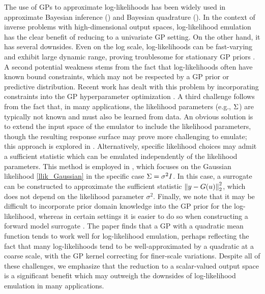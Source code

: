 \documentclass[12pt]{article}
\begin{document}
The use of GPs to approximate log-likelihoods has been widely used in approximate Bayesian inference 
(\cite{VehtariParallelGP, Kandasamy_2017, llikRBF, trainDynamics, quantileApprox, wang2018adaptive, landslideCalibration})
and Bayesian quadrature (\cite{BayesQuadrature, BayesQuadRatios}). In the context of inverse problems with 
high-dimensional output spaces, log-likelihood emulation has the clear benefit of reducing to a univariate GP setting. 
On the other hand, it has several downsides. Even on the log scale, log-likelihoods can be fast-varying and exhibit large 
dynamic range, proving troublesome for stationary GP priors \cite{wang2018adaptive}. A second potential weakness 
stems from the fact that log-likelihoods often have known bound constraints, which may not be respected by a GP 
prior or predictive distribution. Recent work has dealt with this problem by incorporating constraints into the 
GP hyperparameter optimization \cite{quantileApprox}. A third challenge follows from the fact that, in many applications, 
the likelihood parameters (e.g., $\Sigma$) are typically not known and must also be learned from data. An obvious 
solution is to extend the input space of the emulator to include the likelihood parameters, though the resulting response surface 
may prove more challenging to emulate; this approach is explored in \cite{llikRBF}. Alternatively, specific likelihood 
choices may admit a sufficient statistic which can be emulated independently of the likelihood parameters. This method is employed 
in \cite{FerEmulation}, which focuses on the Gaussian likelihood \ref{llik_Gaussian} in the specific case $\Sigma = \sigma^2 I$. In this 
case, a surrogate can be constructed to approximate the sufficient statistic $\left\lVert y - G(u)\right\rVert_2^2$, 
which does not depend on the likelihood parameter $\sigma^2$. 
Finally, we note that it may be difficult to incorporate prior domain knowledge 
into the GP prior for the log-likelihood, whereas in certain settings it is easier to do so when constructing a forward model 
surrogate \cite{GP_PDE_priors}. The paper \cite{VehtariParallelGP} finds that a GP with a quadratic mean function tends to 
work well for log-likelihood emulation, perhaps reflecting the fact that many log-likelihoods tend to be well-approximated by 
a quadratic at a coarse scale, with the GP kernel correcting for finer-scale variations. 
Despite all of these challenges, we emphasize that the reduction to a scalar-valued output space is a significant benefit which 
may outweigh the downsides of log-likelihood emulation in many applications. 
\end{document}
